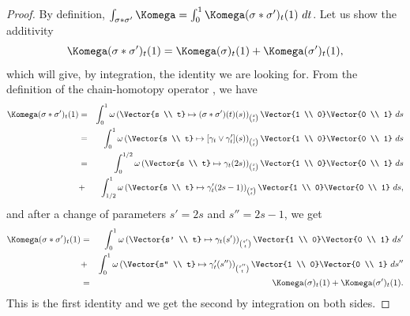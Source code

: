 \begin{proof}
  By definition,
  $\int_{\sigma * \sigma'} \Komega = \int_0^1 \Komega(\sigma * \sigma')_t(1) \ dt$.
  Let us show the additivity
  $$
    \Komega(\sigma * \sigma')_t(1) = \Komega(\sigma)_t(1) + \Komega(\sigma')_t(1),
    $$
  which will give,
  by integration,
  the identity we are looking for.
  From the definition of the chain-homotopy operator \cite[]{PIZ13},
  we have
  \begin{eqnarray*}
    \Komega(\sigma * \sigma')_t(1)
    & =& \int_0^1 \omega \left(\Vector{s \\ t} \mapsto (\sigma * \sigma')(t) (s) \right)_{{s \choose t}}\Vector{1 \\ 0} \Vector{0 \\ 1} \ ds \\
    & =& \int_0^1 \omega \left(\Vector{s \\ t} \mapsto [\gamma_t \vee \gamma'_t] (s) \right)_{{s \choose t}}\Vector{1 \\ 0} \Vector{0 \\ 1} \ ds \\
    & =& \int_0^{1/2} \omega \left(\Vector{s \\ t} \mapsto \gamma_t(2s) \right)_{{s \choose t}}\Vector{1 \\ 0} \Vector{0 \\ 1} \ ds \\
    & + & \int_{1/2}^1 \omega \left(\Vector{s \\ t} \mapsto \gamma'_t(2s-1) \right)_{{s \choose t}}\Vector{1 \\ 0} \Vector{0 \\ 1} \ ds,
  \end{eqnarray*}
  and after a change of parameters $s' = 2s$ and $s'' = 2s-1$, we get
  \begin{eqnarray*}
    \Komega(\sigma * \sigma')_t(1)
    & =& \int_0^1 \omega \left(\Vector{s' \\ t} \mapsto \gamma_t(s') \right)_{{s' \choose t}}\Vector{1 \\ 0} \Vector{0 \\ 1} \ ds' \\
    & + & \int_0^1 \omega \left(\Vector{s'' \\ t} \mapsto \gamma'_t(s'') \right)_{{s'' \choose t}}\Vector{1 \\ 0} \Vector{0 \\ 1} \ ds'' \\
    & = & \Komega(\sigma)_t(1) + \Komega(\sigma')_t(1).
  \end{eqnarray*}
  This is the first identity and we get the second by integration on both sides.
\end{proof}

